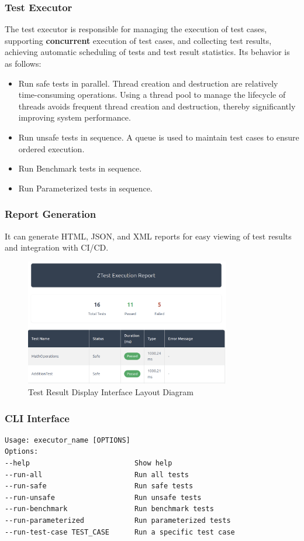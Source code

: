 \documentclass{article}
\begin{document}
\subsubsection{Test Executor}
The test executor is responsible for managing the execution of test cases, supporting \textbf{concurrent} execution of test cases, and collecting test results, achieving automatic scheduling of tests and test result statistics.
Its behavior is as follows:
\begin{itemize}
    \item Run safe tests in parallel. Thread creation and destruction are relatively time-consuming operations. Using a thread pool to manage the lifecycle of threads avoids frequent thread creation and destruction, thereby significantly improving system performance.
    \item Run unsafe tests in sequence. A queue is used to maintain test cases to ensure ordered execution.
    \item Run Benchmark tests in sequence.
    \item Run Parameterized tests in sequence.
\end{itemize}
\subsubsection{Report Generation}
It can generate HTML, JSON, and XML reports for easy viewing of test results and integration with CI/CD.
\begin{figure}[H]
    \centering
    \includegraphics[width=0.8\textwidth]{img/report.png}
    \caption{Test Result Display Interface Layout Diagram}
    \label{fig:report}
    \small
\end{figure}
\subsubsection{CLI Interface}
\begin{framed}
    \begin{lstlisting}
Usage: executor_name [OPTIONS] 
Options: 
--help                         Show help 
--run-all                      Run all tests
--run-safe                     Run safe tests
--run-unsafe                   Run unsafe tests
--run-benchmark                Run benchmark tests
--run-parameterized            Run parameterized tests
--run-test-case TEST_CASE      Run a specific test case
\end{lstlisting}
\end{framed}
\end{document}
